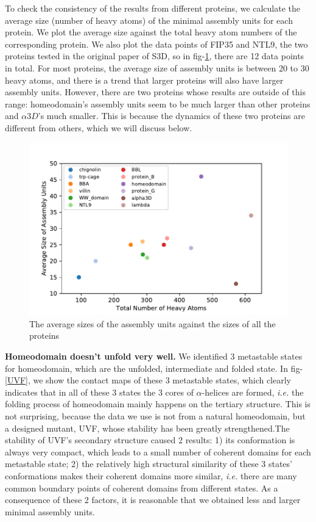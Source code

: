 \documentclass[12pt]{article}
\begin{document}
To check the consistency of the results from different proteins, we calculate the average size (number of heavy atoms) of the minimal assembly units for each protein. We plot the average size against the total heavy atom numbers of the corresponding protein. We also plot the data points of FIP35 and NTL9, the two proteins tested in the original paper of S3D\cite{Lrenzo_S3D}, so in fig-\ref{all_stat}, there are 12 data points in total. For most proteins, the average size of assembly units is between 20 to 30 heavy atoms, and there is a trend that larger proteins will also have larger assembly units. However, there are two proteins whose results are outside of this range: homeodomain's assembly units seem to be much larger than other proteins and $\alpha 3D$'s much smaller. This is because the dynamics of these two proteins are different from others, which we will discuss below.

\begin{figure}[htbp]
  \centering
  \includegraphics[width=1\textwidth]{stat_size_color.pdf}
  \caption{\label{all_stat}The average sizes of the assembly units against the sizes of all the proteins}
\end{figure}

\setlength{\parindent}{0em}

{\bf Homeodomain doesn't unfold very well.} We identified 3 metastable states for homeodomain, which are the unfolded, intermediate and folded state. In fig-\ref{UVF}, we show the contact maps of these 3 metastable states, which clearly indicates that in all of these 3 states the 3 cores of $\alpha$-helices are formed, {\it i.e.} the folding process of homeodomain mainly happens on the tertiary structure. This is not surprising, because the data we use is not from a natural homeodomain, but a designed mutant, UVF, whose stability has been greatly strengthened\cite{UVF_origin}.The stability of UVF's secondary structure caused 2 results: 1) its conformation is always very compact, which leads to a small number of coherent domains for each metastable state; 2) the relatively high structural similarity of these 3 states' conformations makes their coherent domains more similar, {\it i.e.} there are many common boundary points of coherent domains from different states. As a consequence of these 2 factors, it is reasonable that we obtained less and larger minimal assembly units.
\end{document}

